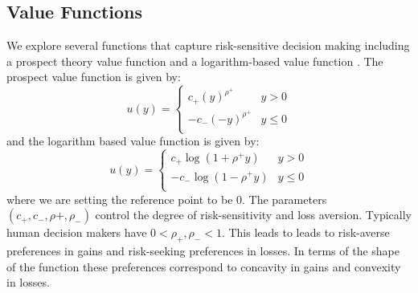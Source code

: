 \documentclass{article}
\begin{document}
\subsection{Value Functions}\label{value}
We explore several functions that capture risk-sensitive decision making including a prospect theory value function \cite{tversky1992advances} and a logarithm-based value function \cite{mazumdar:2017aa}. The prospect value function is given by:
\begin{equation}u(y) = 
\begin{cases}
c_+ (y)^{\rho^+} & y > 0 \\
-c_- (-y)^{\rho^+} & y \leq 0 \\
\end{cases}
\end{equation}
and the logarithm based value function is given by:
\begin{equation}u(y) = 
\begin{cases}
c_+ \log(1 + \rho^+y)& y > 0 \\
-c_- \log(1 - \rho^+y) & y \leq 0 \\
\end{cases}
\end{equation}
where we are setting the reference point to be 0. The parameters $(c_+, c_-, \rho+, \rho_-)$ control the degree of risk-sensitivity and loss aversion. Typically human decision makers have $0 < \rho_+, \rho_- < 1$. This leads to leads to risk-averse preferences in gains and risk-seeking preferences in losses. In terms of the shape of the function these preferences correspond to concavity in gains and convexity in losses.
\end{document}
